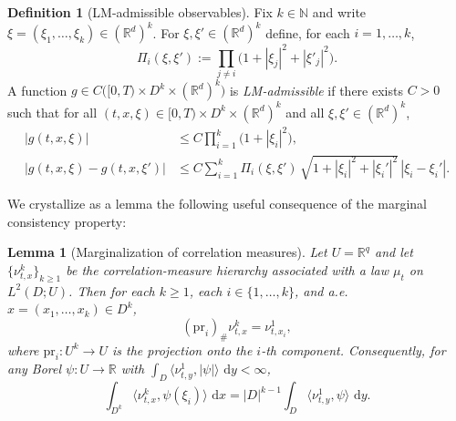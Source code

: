 \documentclass{article}
\numberwithin{equation}{section}
\theoremstyle{plain}
\newtheorem{lemma}[theorem]{Lemma}
\theoremstyle{definition}
\newtheorem{definition}[theorem]{Definition}
\theoremstyle{remark}
\newcommand{\N}{\mathbb{N}}
\newcommand{\R}{\mathbb{R}}
\newcommand{\dd}{\,\mathrm{d}}
\begin{document}
\begin{definition}[LM-admissible observables]\label{def:LM-adm}
Fix $k\in\N$ and write $\xi=(\xi_1,\dots,\xi_k)\in(\R^d)^k$. For $\xi,\xi'\in(\R^d)^k$ define, for each $i=1,\dots,k$,
\[
\Pi_i(\xi,\xi'):=\prod_{j\ne i}\bigl(1+|\xi_j|^2+|\xi'_j|^2\bigr).
\]
A function $g\in C\big([0,T)\times D^k\times(\R^d)^k\big)$ is \emph{LM-admissible} if there exists $C>0$ such that for all
$(t,x,\xi)\in[0,T)\times D^k\times(\R^d)^k$ and all $\xi,\xi'\in(\R^d)^k$,
\begin{align}
|g(t,x,\xi)|
&\le C\prod_{i=1}^k\bigl(1+|\xi_i|^2\bigr),
\label{eq:adm-growth}\\
|g(t,x,\xi)-g(t,x,\xi')|
&\le
C\sum_{i=1}^k
\Pi_i(\xi,\xi')\,\sqrt{1+|\xi_i|^2+|\xi_i'|^2}\,|\xi_i-\xi_i'|.
\label{eq:adm-lip}
\end{align}
\end{definition}

We crystallize as a lemma the following useful consequence of the marginal consistency property:
\begin{lemma}[Marginalization of correlation measures]\label{lem:corr-marg}
Let $U=\R^q$ and let $\{\nu^k_{t,x}\}_{k\ge 1}$ be the correlation-measure hierarchy associated with a law $\mu_t$ on $L^2(D;U)$.
Then for each $k\ge 1$, each $i\in\{1,\dots,k\}$, and a.e.\ $x=(x_1,\dots,x_k)\in D^k$,
\[
(\mathrm{pr}_i)_\#\nu^k_{t,x}=\nu^1_{t,x_i},
\]
where $\mathrm{pr}_i:U^k\to U$ is the projection onto the $i$-th component.
Consequently, for any Borel $\psi:U\to\R$ with $\int_D\langle \nu^1_{t,y},|\psi|\rangle\,\dd y<\infty$,
\[
\int_{D^k}\langle \nu^k_{t,x},\psi(\xi_i)\rangle\,\dd x
=
|D|^{k-1}\int_D\langle \nu^1_{t,y},\psi\rangle\,\dd y.
\]
\end{lemma}
\end{document}
